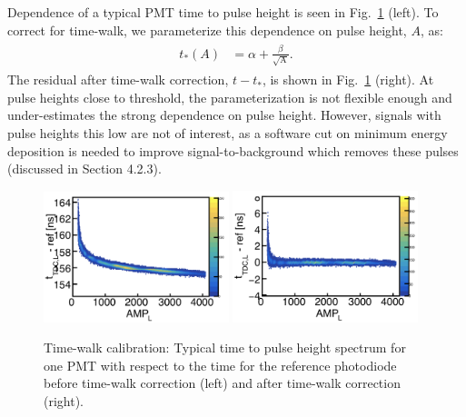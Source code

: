 \documentclass[3p,final,twocolumn]{elsarticle}
\begin{document}
{Dependence of a typical PMT time to pulse height is seen in Fig.~\ref{fig:time_walk} (left). To correct for time-walk, we parameterize 
this dependence on pulse height, $A$, as:
\begin{eqnarray}
	\begin{split}
		t_*(A)	&= \alpha + \frac{\beta}{\sqrt{\textrm{A}}}.				
		\label{eqn:time_walk}
	\end{split}
\end{eqnarray}
The residual after time-walk correction, $t-t_*$, is shown in Fig.~\ref{fig:time_walk} (right). At pulse heights close to threshold, the 
parameterization is not flexible enough and under-estimates the strong dependence on pulse height. However, signals with pulse 
heights this low are not of interest, as a software cut on minimum energy deposition is needed to improve signal-to-background 
which removes these pulses (discussed in Section {\color{red}4.2.3}).

\begin{figure}[h!]
	\centering
		\includegraphics[width=0.48\textwidth]{tw_before.png}
		\includegraphics[width=0.48\textwidth]{tw_after.png}
	\caption{Time-walk calibration: Typical time to pulse height spectrum for one PMT with respect to the time for the reference photodiode before time-walk correction (left) and after time-walk correction (right).}
	\label{fig:time_walk}
\end{figure}

}
\end{document}
